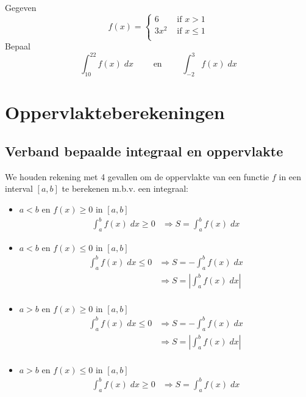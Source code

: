 \documentclass[a4paper,12pt, twoside]{article}
\begin{document}
\begin{oefening} %
Gegeven
$$f(x)=\begin{cases}6 & \mbox{ if } x > 1\\3x^2 & \mbox{ if } x \leq 1\\\end{cases}$$
Bepaal
$$\displaystyle \int_{10}^{22} f(x) \;dx \qquad\mbox{ en }\qquad \displaystyle \int_{-2}^{3} f(x) \;dx$$
\end{oefening}

\cleardoublepage
\section{Oppervlakteberekeningen}

\subsection{Verband bepaalde integraal en oppervlakte}

We houden rekening met 4 gevallen om de oppervlakte van een functie $f$ in een interval $[a,b]$ te berekenen m.b.v. een integraal:
\begin{itemize}
  \item $a<b$ en $f(x)\geq0$ in $[a,b]$
  \begin{align*}
    \int_a^b f(x)\; dx \geq 0 & \Rightarrow S=\int_a^b f(x)\; dx
  \end{align*}
  \item $a<b$ en $f(x)\leq0$ in $[a,b]$
  \begin{align*}
    \int_a^b f(x)\; dx \leq 0 & \Rightarrow S=-\int_a^b f(x)\; dx  \\
                        & \Rightarrow S=|\int_a^b f(x)\; dx| \\
  \end{align*}
  \item $a>b$ en $f(x)\geq0$ in $[a,b]$
  \begin{align*}
    \int_a^b f(x)\; dx \leq 0 & \Rightarrow S=-\int_a^b f(x)\; dx  \\
                        & \Rightarrow S=|\int_a^b f(x)\; dx| \\
  \end{align*}
  \item $a>b$ en $f(x)\leq0$ in $[a,b]$
  \begin{align*}
    \int_a^b f(x)\; dx \geq 0 & \Rightarrow S=\int_a^b f(x)\; dx
  \end{align*}
\end{itemize}
\end{document}
